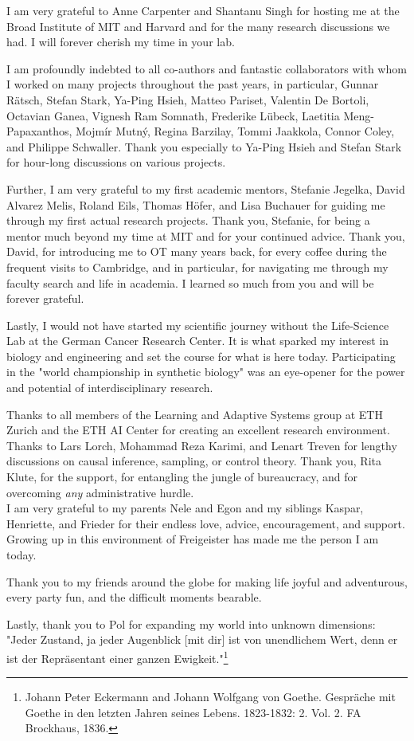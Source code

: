 I am very grateful to Anne Carpenter and Shantanu Singh for hosting me at the Broad Institute of MIT and Harvard and for the many research discussions we had. I will forever cherish my time in your lab.

I am profoundly indebted to all co-authors and fantastic collaborators with whom I worked on many projects throughout the past years, in particular, Gunnar R\"atsch, Stefan Stark, Ya-Ping Hsieh,  Matteo Pariset, Valentin De Bortoli, Octavian Ganea, Vignesh Ram Somnath, Frederike L{\"u}beck, Laetitia Meng-Papaxanthos, Mojm{\'i}r Mutn{\'y}, Regina Barzilay, Tommi Jaakkola, Connor Coley, and Philippe Schwaller. Thank you especially to Ya-Ping Hsieh and Stefan Stark for hour-long discussions on various projects. 

Further, I am very grateful to my first academic mentors, Stefanie Jegelka, David Alvarez Melis, Roland Eils, Thomas H{\"o}fer, and Lisa Buchauer for guiding me through my first actual research projects.
Thank you, Stefanie, for being a mentor much beyond my time at MIT and for your continued advice. 
Thank you, David, for introducing me to \acrlong{OT} many years back, for every coffee during the frequent visits to Cambridge, and in particular, for navigating me through my faculty search and life in academia. I learned so much from you and will be forever grateful.

Lastly, I would not have started my scientific journey without the Life-Science Lab at the German Cancer Research Center. It is what sparked my interest in biology and engineering and set the course for what is here today.
Participating in the "world championship in synthetic biology" was an eye-opener for the power and potential of interdisciplinary research.

 Thanks to all members of the Learning and Adaptive Systems group at ETH Zurich and the ETH AI Center for creating an excellent research environment. Thanks to Lars Lorch, Mohammad Reza Karimi, and Lenart Treven for lengthy discussions on causal inference, sampling, or control theory. 
Thank you, Rita Klute, for the support, for entangling the jungle of bureaucracy, and for overcoming \emph{any} administrative hurdle. \\

I am very grateful to my parents Nele and Egon and my siblings Kaspar, Henriette, and Frieder for their endless love, advice, encouragement, and support.
Growing up in this environment of Freigeister has made me the person I am today.

Thank you to my friends around the globe for making life joyful and adventurous, every party fun, and the difficult moments bearable.

Lastly, thank you to Pol for expanding my world into unknown dimensions: "Jeder Zustand, ja jeder Augenblick [mit dir] ist von unendlichem Wert, denn er ist der Repr{\"a}sentant einer ganzen Ewigkeit."\footnote{Johann Peter Eckermann and Johann Wolfgang von Goethe. Gespr{\"a}che mit Goethe in den letzten Jahren seines Lebens. 1823-1832: 2. Vol. 2. FA Brockhaus, 1836.}

\endgroup